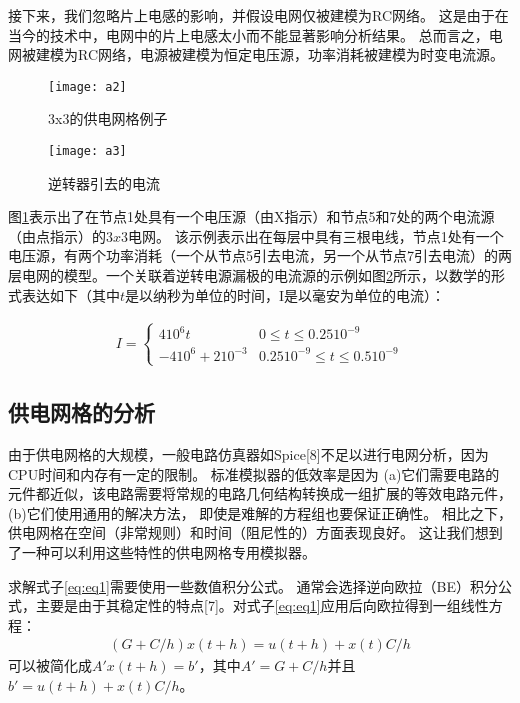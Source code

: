 接下来，我们忽略片上电感的影响，并假设电网仅被建模为RC网络。 这是由于在当今的技术中，电网中的片上电感太小而不能显著影响分析结果。 总而言之，电网被建模为RC网络，电源被建模为恒定电压源，功率消耗被建模为时变电流源。

\begin{figure}[H] %
  \centering
  \texttt{[image: a2]}
  \caption{3x3的供电网格例子}
  \label{fig:a2}
\end{figure}

\begin{figure}[H] %
  \centering
  \texttt{[image: a3]}
  \caption{逆转器引去的电流}
  \label{fig:a3}
\end{figure}

图\ref{fig:a2}表示出了在节点1处具有一个电压源（由X指示）和节点5和7处的两个电流源（由点指示）的$3x3$电网。 该示例表示出在每层中具有三根电线，节点1处有一个电压源，有两个功率消耗（一个从节点5引去电流，另一个从节点7引去电流）的两层电网的模型。一个关联着逆转电源漏极的电流源的示例如图\ref{fig:a3}所示，以数学的形式表达如下（其中$t$是以纳秒为单位的时间，I是以毫安为单位的电流）：

\begin{align}
I=\begin{cases}
    410^6t & 0\leq t \leq 0.2510^{-9}\\
    -410^6 + 210^{-3} & 0.2510^{-9} \leq t \leq 0.510^{-9}
\end{cases}
\end{align}

\subsection{供电网格的分析}

由于供电网格的大规模，一般电路仿真器如Spice[8]不足以进行电网分析，因为CPU时间和内存有一定的限制。 标准模拟器的低效率是因为 (a)它们需要电路的元件都近似，该电路需要将常规的电路几何结构转换成一组扩展的等效电路元件，(b)它们使用通用的解决方法， 即使是难解的方程组也要保证正确性。 相比之下，供电网格在空间（非常规则）和时间（阻尼性的）方面表现良好。 这让我们想到了一种可以利用这些特性的供电网格专用模拟器。

求解式子\ref{eq:eq1}需要使用一些数值积分公式。 通常会选择逆向欧拉（BE）积分公式，主要是由于其稳定性的特点[7]。对式子\ref{eq:eq1}应用后向欧拉得到一组线性方程：
\begin{align}
(G+C/h)x(t+h)=u(t+h)+x(t)C/h
\label{eq:eq2}
\end{align}
可以被简化成$A'x(t+h)=b'$，其中$A'=G+C/h$并且$b'=u(t+h)+x(t)C/h$。

